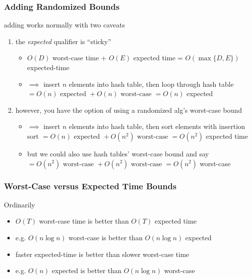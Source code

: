 \documentclass[10pt]{beamer}
\begin{document}
\begin{frame} \frametitle{Adding Randomized Bounds}
adding works normally with two caveats
\begin{enumerate}
  \item the \emph{expected} qualifier is ``sticky''
    \begin{itemize}
      \item $O(D)$ worst-case time + $O(E)$ expected time = $O(\max\{D,E\})$ expected-time
      \item $\implies$ insert $n$ elements into hash table, then loop through hash table
        $= O(n) \text{ expected } + O(n) \text{ worst-case } = O(n)$ expected
    \end{itemize}
  \item however, you have the option of using a randomized alg's worst-case bound
    \begin{itemize}
      \item $\implies$ insert $n$ elements into hash table, then sort elements with
        insertion sort
        $ = O(n) \text{ expected } + O(n^2) \text{ worst-case } = O(n^2)$ expected time
      \item but we could also use hash tables' worst-case bound and say
        $= O(n^2) \text{ worst-case } + O(n^2) \text{ worst-case } = O(n^2)$ worst-case
    \end{itemize}
\end{enumerate}
\end{frame}

\begin{frame} \frametitle{Worst-Case versus Expected Time Bounds}
Ordinarily
\begin{itemize}
\item $O(T)$ worst-case time is better than $O(T)$ expected time
  \item e.g. $O(n \log n)$ worst-case is better than $O(n \log n)$ expected
  \item faster expected-time is better than slower worst-case time
    \item e.g. $O(n)$ expected is better than $O(n \log n)$ worst-case
\end{itemize}
\end{frame}
\end{document}
